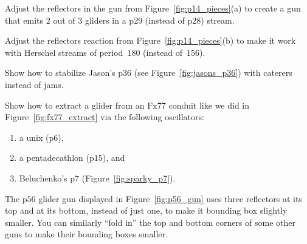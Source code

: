 \begin{multicols}{2}
	
	\mfilbreak
	
	
	\begin{problem}\label{exer:p28_adjust_29}
		Adjust the reflectors in the gun from Figure~\ref{fig:p14_pieces}(a) to create a gun that emits $2$ out of $3$ gliders in a p$29$ (instead of p$28$) stream.
	\end{problem}
	
	
	\mfilbreak
	
	
	\begin{problem}\label{exer:p156_adjust_lwss}
		Adjust the reflectors reaction from Figure~\ref{fig:p14_pieces}(b) to make it work with Herschel streams of period~$180$ (instead of~$156$).
	\end{problem}
	
	
	\mfilbreak
	
	
	\begin{problem}\label{exer:jasons_p36_caterer}
		Show how to stabilize Jason's p$36$ (see Figure~\ref{fig:jasons_p36}) with caterers instead of jams.
	\end{problem}
	
	
	\mfilbreak
	
	
	\begin{problem}\label{exer:fx77_extract_other_osc}
		Show how to extract a glider from an Fx77 conduit like we did in Figure~\ref{fig:fx77_extract} via the following oscillators:
		
		\begin{enumerate}[label=\bf\color{ocre}(\alph*)]
			\item a unix (p$6$),
			
			\item a pentadecathlon (p$15$), and
			
			\item Beluchenko's p$7$ (Figure~\ref{fig:sparky_p7}).
		\end{enumerate}
	\end{problem}
	
	
	\mfilbreak
	
	
	\begin{problem}\label{exer:p54_fold_corners}
		The p$56$ glider gun displayed in Figure~\ref{fig:p56_gun} uses three reflectors at its top and at its bottom, instead of just one, to make it bounding box slightly smaller. You can similarly ``fold in'' the top and bottom corners of some other guns to make their bounding boxes smaller.
		

\end{problem}
\end{multicols}
